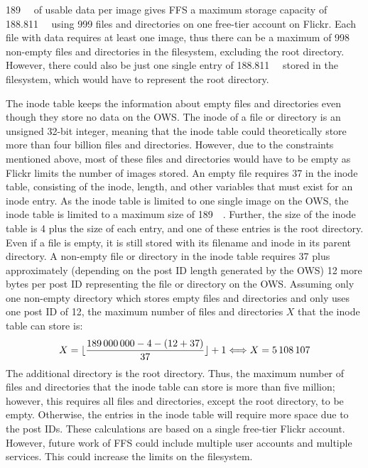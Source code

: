 \SI{189}{\mega\byte} of usable data per image gives \gls{FFS} a maximum storage capacity of \SI{188.811}{\giga\byte} using 999 files and directories on one \mbox{free-tier} account on Flickr. Each file with data requires at least one image, thus there can be a maximum of 998 \mbox{non-empty} files and directories in the filesystem, excluding the root directory. However, there could also be just one single entry of \SI{188.811}{\giga\byte} stored in the filesystem, which would have to represent the root directory.

The inode table keeps the information about empty files and directories even though they store no data on the \gls{OWS}. The inode of a file or directory is an unsigned \mbox{32-bit} integer, meaning that the inode table could theoretically store more than four billion files and directories. However, due to the constraints mentioned above, most of these files and directories would have to be empty as Flickr limits the number of images stored. An empty file requires \SI{37}{\byte} in the inode table, consisting of the inode, length, and other variables that must exist for an inode entry. As the inode table is limited to one single image on the \gls{OWS}, the inode table is limited to a maximum size of \SI{189}{\mega\byte}. Further, the size of the inode table is \SI{4}{\byte} plus the size of each entry, and one of these entries is the root directory. Even if a file is empty, it is still stored with its filename and inode in its parent directory. A \mbox{non-empty} file or directory in the inode table requires \SI{37}{\byte} plus approximately (depending on the post ID length generated by the \gls{OWS}) 12 more bytes per post ID representing the file or directory on the \gls{OWS}. Assuming only one \mbox{non-empty} directory which stores empty files and directories and only uses one post ID of \SI{12}{\byte}, the maximum number of files and directories $X$ that the inode table can store is:
$$
	X = \lfloor \frac{189\,000\,000 - 4 - (12 + 37)}{37} \rfloor + 1 \Longleftrightarrow X = 5\,108\,107
$$
The additional directory is the root directory. Thus, the maximum number of files and directories that the inode table can store is more than five million; however, this requires all files and directories, except the root directory, to be empty. Otherwise, the entries in the inode table will require more space due to the post IDs. These calculations are based on a single \mbox{free-tier} Flickr account. However, future work of \gls{FFS} could include multiple user accounts and multiple services. This could increase the limits on the filesystem.

